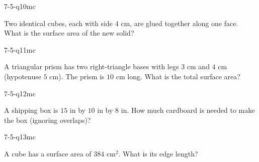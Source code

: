 \begin{practiceQuestion}{7-5-q10}{mc}
\begin{questionText}
Two identical cubes, each with side $4$ cm, are glued together along one face. What is the surface area of the new solid?
\end{questionText}
\end{practiceQuestion}

\begin{practiceQuestion}{7-5-q11}{mc}
\begin{questionText}
A triangular prism has two right-triangle bases with legs $3$ cm and $4$ cm (hypotenuse $5$ cm). The prism is $10$ cm long. What is the total surface area?
\end{questionText}
\end{practiceQuestion}

\begin{practiceQuestion}{7-5-q12}{mc}
\begin{questionText}
A shipping box is $15$ in by $10$ in by $8$ in. How much cardboard is needed to make the box (ignoring overlaps)?
\end{questionText}
\end{practiceQuestion}

\begin{practiceQuestion}{7-5-q13}{mc}
\begin{questionText}
A cube has a surface area of $384$ cm$^2$. What is its edge length?
\end{questionText}
\end{practiceQuestion}

